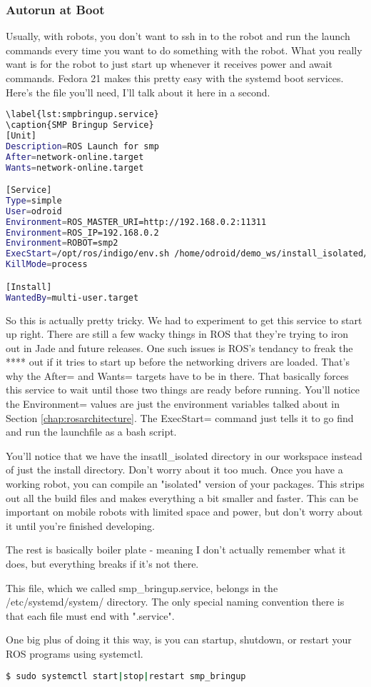 \subsubsection{Autorun at Boot}

Usually, with robots, you don't want to ssh in to the robot and run the launch commands every time you want to do something with the robot. What you really want is for the robot to just start up whenever it receives power and await commands. Fedora 21 makes this pretty easy with the systemd boot services. Here's the file you'll need, I'll talk about it here in a second.

\begin{lstlisting}[language=bash]
\label{lst:smpbringup.service}
\caption{SMP Bringup Service}
[Unit]
Description=ROS Launch for smp
After=network-online.target
Wants=network-online.target

[Service]
Type=simple
User=odroid
Environment=ROS_MASTER_URI=http://192.168.0.2:11311
Environment=ROS_IP=192.168.0.2
Environment=ROBOT=smp2
ExecStart=/opt/ros/indigo/env.sh /home/odroid/demo_ws/install_isolated/env.sh roslaunch smp_bringup smp.launch --wait
KillMode=process

[Install]
WantedBy=multi-user.target
\end{lstlisting}

So this is actually pretty tricky. We had to experiment to get this service to start up right. There are still a few wacky things in ROS that they're trying to iron out in Jade and future releases. One such issues is ROS's tendancy to freak the **** out if it tries to start up before the networking drivers are loaded. That's why the After= and Wants= targets have to be in there. That basically forces this service to wait until those two things are ready before running. You'll notice the Environment= values are just the environment variables talked about in Section \ref{chap:rosarchitecture}. The ExecStart= command just tells it to go find and run the launchfile as a bash script.

You'll notice that we have the insatll\_isolated directory in our workspace instead of just the install directory. Don't worry about it too much. Once you have a working robot, you can compile an "isolated" version of your packages. This strips out all the build files and makes everything a bit smaller and faster. This can be important on mobile robots with limited space and power, but don't worry about it until you're finished developing.

The rest is basically boiler plate - meaning I don't actually remember what it does, but everything breaks if it's not there.

This file, which we called smp\_bringup.service, belongs in the /etc/systemd/system/ directory. The only special naming convention there is that each file must end with ".service".

One big plus of doing it this way, is you can startup, shutdown, or restart your ROS programs using systemctl.

\begin{lstlisting}[language=bash]
  $ sudo systemctl start|stop|restart smp_bringup
\end{lstlisting}
